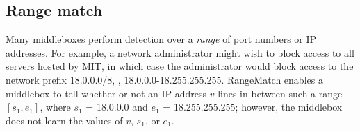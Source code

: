 

%
%
%
%
%
%
%
%
%
%
%
%

\subsection{Range match } \label{sec:range}




Many middleboxes perform detection over a {\it range} of port numbers or IP addresses. For example, a network administrator might wish to block access to all servers hosted by MIT, in which case the administrator would block access to the network prefix 18.0.0.0/8, \ie{}, 18.0.0.0-18.255.255.255. RangeMatch enables a middlebox to tell whether or not an IP address $v$ lines in between such a range $[s_1, e_1]$, where $s_1$ = 18.0.0.0 and $e_1$ = 18.255.255.255; however, the middlebox does not learn the values of $v$, $s_1$, or $e_1$.

